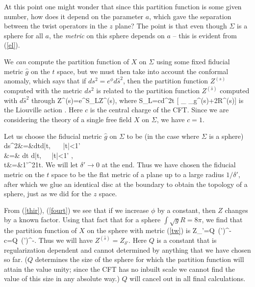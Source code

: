 \documentclass[12pt]{article}
\begin{document}
At this point one might wonder that since this partition function is
some given number, how does it depend on the
parameter $a$, which gave the separation between the twist operators
in the $z$ plane? The point is that even though
$\Sigma$ is a sphere for all $a$, the {\it metric} on this sphere
depends on $a$ -- this is evident from (\ref{el}).

We {\it can} compute the partition function of $X$ on $\Sigma$ using
some fixed fiducial metric $\hat g$ on the $t$ space,
but we must then take into account the conformal anomaly, which says
that if $ds^2=e^\phi d{\hat s}^2$, then
the partition function $Z^{(s)}$ computed with the metric $ds^2$ is
related to the partition function $Z^{(\hat s)}$
computed with $d\hat s^2$ through
\be
Z^{(s)}=e^{S_L}Z^{(\hat s)},
\label{thir}
\ee
where
\be
S_L={c\pi}\int d^2t [ \partial_\mu\phi
\partial_\nu\phi g^{(\hat s)\mu\nu}+2R^{(\hat s)}\phi]
\label{fourt}
\ee
is the Liouville action \cite{friedan}.  Here $c$ is the central
charge of the CFT. Since we are considering  the theory of a
single free field $X$ on $\Sigma$, we have $c=1$.

Let us choose the fiducial metric $\hat g$ on $\Sigma$ to be (in the
case where $\Sigma$ is a sphere)
\bea
d\hat s^2&=&dtd\bar t, ~~~|t|<{1\over \delta'}\nonumber \\
&=& d\tilde t d\bar{\tilde t},~~~|\tilde t|<{1\over \delta' },\nonumber \\
\tilde t&=&{1\over \delta'^2}{1\over t}.
\label{tw}
\eea
We will let $\delta'\rightarrow 0$  at the end. Thus we have chosen 
the fiducial metric on
the
$t$ space to be the flat metric of a plane  up to a large radius
$1/\delta'$, after which we glue an identical disc at the
boundary to obtain the topology of a sphere, just as we did for the $z$ space.


    From (\ref{thir}), (\ref{fourt}) we see that if we increase $\phi$ by
a constant, then $Z$ changes by a known factor.
Using that fact that for a sphere $\int \sqrt{g}R=8\pi$, we find that
the partition function of $X$ on the sphere with metric (\ref{tw}) is
\be
Z_{\delta'}=Q~(\delta')^{-{c}}=Q~(\delta')^{-}.
\label{mone}
\ee
Thus we will have $Z^{(\hat s)}=Z_{\delta'}$. Here $Q$ is a
constant that is regularization dependent and
cannot  determined by anything that we have
chosen so far. ($Q$ determines the size of the sphere  for which  the
partition function will attain the value unity;
since the CFT has no inbuilt scale we cannot find the value of this
size in any absolute way.)  $Q$ will
cancel out in all final calculations.
\end{document}
